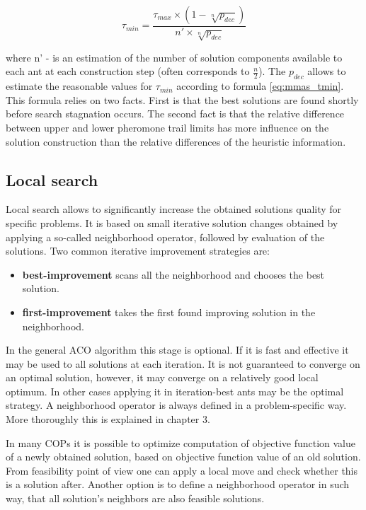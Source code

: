 \documentclass[12pt,a4paper,oneside]{book}
\begin{document}
\begin{equation}
\tau_{min} = \frac{\tau_{max} \times (1 - \sqrt[n]{p_{dec}})}{n' \times \sqrt[n]{p_{dec}}} 
\label{eq:mmas_tmin}
\end{equation}

where n' - is an estimation of the number of solution components available to each ant at each construction step (often corresponds to $\frac{n}{2}$). The $p_{dec}$ allows to estimate the reasonable values for $\tau_{min}$ according to formula \eqref{eq:mmas_tmin}. This formula relies on two facts. First is that the best solutions are found shortly before search stagnation occurs. The second fact is that the relative difference between upper and lower pheromone trail limits has more influence on the solution construction than the relative differences of the heuristic information.

\subsection{Local search}
Local search allows to significantly increase the obtained solutions quality for specific problems. It is based on small iterative solution changes obtained by applying a so-called neighborhood operator, followed by evaluation of the solutions. Two common iterative improvement strategies are:

\begin{itemize}
\item \textbf{best-improvement} scans all the neighborhood and chooses the best solution.
\item \textbf{first-improvement} takes the first found improving solution in the neighborhood.
\end{itemize}


In the general ACO algorithm this stage is optional. If it is fast and effective it may be used to all solutions at each iteration. It is not guaranteed to converge on an optimal solution, however, it may converge on a relatively good local optimum. In other cases applying it in iteration-best ants may be the optimal strategy. A neighborhood operator is always defined in a problem-specific way. More thoroughly this is explained in chapter 3.

In many COPs it is possible to optimize computation of objective function value of a newly obtained solution, based on objective function value of an old solution. From feasibility point of view one can apply a local move and check whether this is a solution after. Another option is to define a neighborhood operator in such way, that all solution's neighbors are also feasible solutions.
\end{document}
